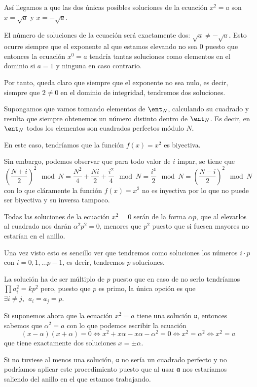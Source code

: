 \begin{problem}[7]
Así llegamos a que las dos únicas posibles soluciones de la ecuación $x^2=a$ son $x=\sqrt{a}$ y $x=-\sqrt{a}$.

El número de soluciones de la ecuación será exactamente dos: $\sqrt{a}\neq - \sqrt{a}$. Esto ocurre siempre que el exponente al que estamos elevando no sea $0$ puesto que entonces la ecuación $x^0=a$ tendría tantas soluciones como elementos en el dominio si $a=1$ y ninguna en caso contrario.

Por tanto, queda claro que siempre que el exponente no sea nulo, es decir, siempre que $2\neq 0$ en el dominio de integridad, tendremos dos soluciones.

\spart

Supongamos que vamos tomando elementos de $\ent_N$, calculando su cuadrado y resulta que siempre obtenemos un número distinto dentro de $\ent_N$. Es decir, en $\ent_N$ todos los elementos son cuadrados perfectos módulo $N$.

En este caso, tendríamos que la función $f(x)=x^2$ es biyectiva.

Sin embargo, podemos observar que para todo valor de $i$ impar, se tiene que
\[\left(\frac{N+i}{2}\right)^2 \mod N= \frac{N^2}{4} + \frac{Ni}{2} + \frac{i^2}{4} \mod N = \frac{i^4}{2} \mod N = \left(\frac{N-i}{2}\right)^2 \mod N\]
con lo que cláramente la función $f(x)=x^2$ no es inyectiva por lo que no puede ser biyectiva y su inversa tampoco.

\spart

Todas las soluciones de la ecuación $x^2=0$ serán de la forma $αp$, que al elevarlos al cuadrado nos darán $α^2p^2=0$, menores que $p^2$ puesto que si fuesen mayores no estarían en el anillo.

Una vez visto esto es sencillo ver que tendremos como soluciones los números $i\cdot p$ con $i=0,1,...p-1$, es decir, tendremos $p$ soluciones.

\obs La solución ha de ser múltiplo de $p$ puesto que en caso de no serlo tendríamos $\prod a_i^2 = kp^2$ pero, puesto que $p$ es primo, la única opción es que $\exists i\neq j, \ \ a_i=a_j=p$. 

Si suponemos ahora que la ecuación $x^2=a$ tiene una solución α, entonces sabemos que $α^2=a$ con lo que podemos escribir la ecuación
\[(x-α)(x+α)=0 \iff x^2+xα-xα-α^2=0 \iff x^2=α^2 \iff x^2=a\]
que tiene exactamente dos soluciones $x=\pm α$.

Si no tuviese al menos una solución, α no sería un cuadrado perfecto y no podríamos aplicar este procedimiento puesto que al usar α nos estaríamos saliendo del anillo en el que estamos trabajando.


\end{problem}
